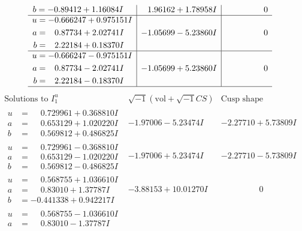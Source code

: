 \documentclass[1p]{elsarticle_modified}
\theoremstyle{definition}
\newcommand{\I}{\sqrt{-1}}
\begin{document}
$$\begin{array}{c|c|c}
\begin{aligned}
b &= -0.89412 + 1.16084 I\end{aligned}
 & \phantom{-}1.96162 + 1.78958 I & \phantom{-0.000000 } 0 \\ \hline\begin{aligned}
u &= -0.666247 + 0.975151 I \\
a &= \phantom{-}0.87734 + 2.02741 I \\
b &= \phantom{-}2.22184 + 0.18370 I\end{aligned}
 & -1.05699 - 5.23860 I & \phantom{-0.000000 } 0 \\ \hline\begin{aligned}
u &= -0.666247 - 0.975151 I \\
a &= \phantom{-}0.87734 - 2.02741 I \\
b &= \phantom{-}2.22184 - 0.18370 I\end{aligned}
 & -1.05699 + 5.23860 I & \phantom{-0.000000 } 0\\
 \hline 
 \end{array}$$\newpage$$\begin{array}{c|c|c}  
\text{Solutions to }I^u_{1}& \I (\text{vol} + \sqrt{-1}CS) & \text{Cusp shape}\\
 \hline 
\begin{aligned}
u &= \phantom{-}0.729961 + 0.368810 I \\
a &= \phantom{-}0.653129 + 1.020220 I \\
b &= \phantom{-}0.569812 + 0.486825 I\end{aligned}
 & -1.97006 - 5.23474 I & -2.27710 + 5.73809 I \\ \hline\begin{aligned}
u &= \phantom{-}0.729961 - 0.368810 I \\
a &= \phantom{-}0.653129 - 1.020220 I \\
b &= \phantom{-}0.569812 - 0.486825 I\end{aligned}
 & -1.97006 + 5.23474 I & -2.27710 - 5.73809 I \\ \hline\begin{aligned}
u &= \phantom{-}0.568755 + 1.036610 I \\
a &= \phantom{-}0.83010 + 1.37787 I \\
b &= -0.441338 + 0.942217 I\end{aligned}
 & -3.88153 + 10.01270 I & \phantom{-0.000000 } 0 \\ \hline\begin{aligned}
u &= \phantom{-}0.568755 - 1.036610 I \\
a &= \phantom{-}0.83010 - 1.37787 I \\

\end{aligned}
\end{array}$$
\end{document}
